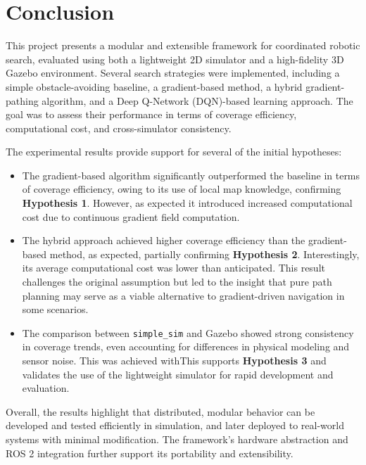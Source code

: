 \section{Conclusion}
\label{sec:Conclusion}
This project presents a modular and extensible framework for coordinated robotic search, evaluated using both a lightweight 2D simulator and a high-fidelity 3D Gazebo environment. Several search strategies were implemented, including a simple obstacle-avoiding baseline, a gradient-based method, a hybrid gradient-pathing algorithm, and a Deep Q-Network (DQN)-based learning approach. The goal was to assess their performance in terms of coverage efficiency, computational cost, and cross-simulator consistency.

The experimental results provide support for several of the initial hypotheses:

\begin{itemize}
    \item The gradient-based algorithm significantly outperformed the baseline in terms of coverage efficiency, owing to its use of local map knowledge, confirming \textbf{Hypothesis 1}. However, as expected it introduced increased computational cost due to continuous gradient field computation.
    \item The hybrid approach achieved higher coverage efficiency than the gradient-based method, as expected, partially confirming \textbf{Hypothesis 2}. Interestingly, its average computational cost was lower than anticipated. This result challenges the original assumption but led to the insight that pure path planning may serve as a viable alternative to gradient-driven navigation in some scenarios.
    \item The comparison between \texttt{simple\_sim} and Gazebo showed strong consistency in coverage trends, even accounting for differences in physical modeling and sensor noise. This was achieved withThis supports \textbf{Hypothesis 3} and validates the use of the lightweight simulator for rapid development and evaluation.
\end{itemize}

Overall, the results highlight that distributed, modular behavior can be developed and tested efficiently in simulation, and later deployed to real-world systems with minimal modification. The framework’s hardware abstraction and ROS 2 integration further support its portability and extensibility.\\


